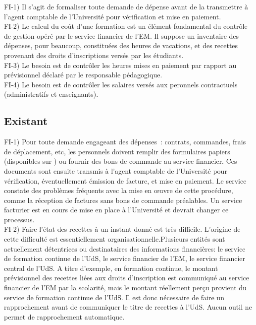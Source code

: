 \documentclass{book}
\begin{document}
\bigskip
FI-1) Il s'agit de formaliser toute demande de dépense avant de la transmettre
à l'agent comptable de l'Université pour vérification et mise en paiement. \\

FI-2) Le calcul du coût d'une formation est un élément fondamental du contrôle
de gestion opéré par le service financier de l'EM. Il suppose un inventaire
des dépenses, pour beaucoup, constituées des heures de vacations, et des recettes
provenant des droits d'inscriptions versés par les étudiants. \\

FI-3) Le besoin est de contrôler les heures mises en paiement par rapport
au prévisionnel déclaré par le responsable pédagogique.\\

FI-4) Le besoin est de contrôler les salaires versés aux peronnels contractuels
(administratifs et enseignants).\\


\subsection{Existant}

FI-1) Pour toute demande engageant des dépenses~: contrats, commandes, frais 
de déplacement, etc, les personnels doivent remplir des formulaires papiers 
(disponibles sur ) ou fournir des bons de commande au service 
financier. Ces documents sont ensuite transmis à l'agent comptable de l'Université 
pour vérification, éventuellement émission de facture, et mise en paiement. Le
service constate des problèmes fréquents avec la mise en {\oe}uvre de cette
procédure, comme la réception de factures sans bons de commande préalables.
Un service facturier est en cours de mise en place à l'Université et devrait
changer ce processus.\\


FI-2) Faire l'état des recettes à un instant donné est très difficile. L'origine
de cette difficulté est essentiellement organisationnelle.Plusieurs entités sont
actuellement détentrices ou destinataires des informations financières:
le service de formation continue de l'UdS, le service financier de l'EM,
le service financier central de l'UdS. A titre d'exemple, en formation continue, 
le montant prévisionnel des recettes liées aux droits d'inscription est communiqué 
au service financier de l'EM par la scolarité, mais le montant réellement perçu 
provient du service de formation continue de l'UdS. Il est donc nécessaire de faire 
un rapprochement avant de communiquer le titre de recettes à l'UdS. Aucun outil
ne permet de rapprochement automatique. 
\end{document}
